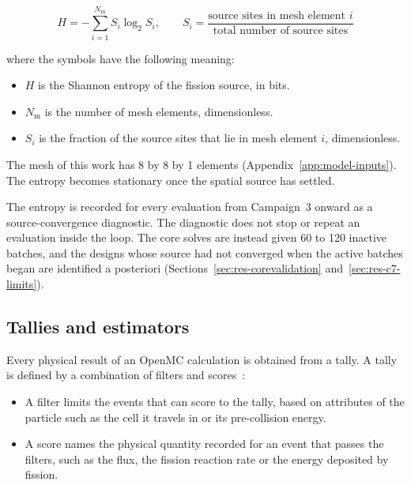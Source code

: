 \begin{equation}
H = -\sum_{i=1}^{N_\mathrm{m}} S_i \log_2 S_i,
\qquad
S_i = \frac{\text{source sites in mesh element } i}
           {\text{total number of source sites}}
\label{eq:shannon}
\end{equation}

\noindent where the symbols have the following meaning:

\begin{itemize}
  \item $H$ is the Shannon entropy of the fission source, in bits.

  \item $N_\mathrm{m}$ is the number of mesh elements, dimensionless.

  \item $S_i$ is the fraction of the source sites that lie in mesh
        element $i$, dimensionless.
\end{itemize}

The mesh of this work has 8 by 8 by 1 elements
(Appendix~\ref{app:model-inputs}). The entropy becomes stationary once
the spatial source has settled.

The entropy is recorded for every evaluation from Campaign~3 onward as a
source-convergence diagnostic. The diagnostic does not stop or repeat an
evaluation inside the loop. The core solves are instead given 60 to 120
inactive batches, and the designs whose source had not converged when
the active batches began are identified a posteriori
(Sections~\ref{sec:res-corevalidation}
and~\ref{sec:res-c7-limits}).

\subsection{Tallies and estimators}
\label{sec:bg-mc-tally}

Every physical result of an OpenMC calculation is obtained from a tally. A tally
is defined by a combination of filters and
scores~\cite{romano_openmc_2015}:

\begin{itemize}
  \item A filter limits the events that can score to the tally, based on
        attributes of the particle such as the cell it travels in or its
        pre-collision energy.

  \item A score names the physical quantity recorded for an event that
        passes the filters, such as the flux, the fission reaction rate
        or the energy deposited by fission.
\end{itemize}

